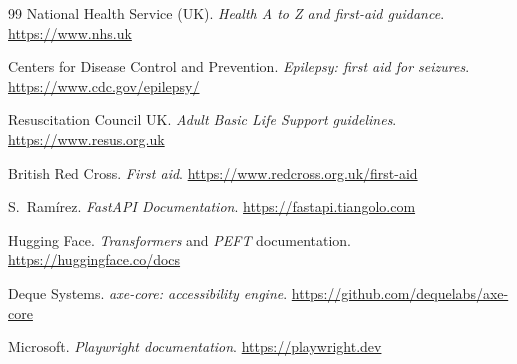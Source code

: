 \documentclass[11pt,a4paper]{article}
\begin{document}
\begin{thebibliography}{99}
 National Health Service (UK). \emph{Health A to Z and first-aid guidance}. \url{https://www.nhs.uk}

 Centers for Disease Control and Prevention. \emph{Epilepsy: first aid for seizures}. \url{https://www.cdc.gov/epilepsy/}

 Resuscitation Council UK. \emph{Adult Basic Life Support guidelines}. \url{https://www.resus.org.uk}

 British Red Cross. \emph{First aid}. \url{https://www.redcross.org.uk/first-aid}

 S.~Ram\'irez. \emph{FastAPI Documentation}. \url{https://fastapi.tiangolo.com}

 Hugging Face. \emph{Transformers} and \emph{PEFT} documentation. \url{https://huggingface.co/docs}

 Deque Systems. \emph{axe-core: accessibility engine}. \url{https://github.com/dequelabs/axe-core}

 Microsoft. \emph{Playwright documentation}. \url{https://playwright.dev}

\end{thebibliography}
\end{document}
